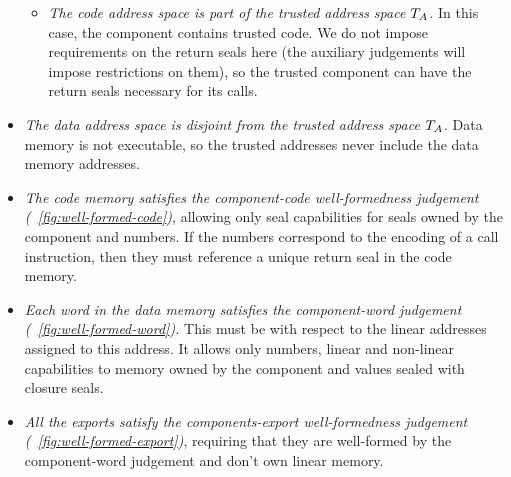 \documentclass[acmsmall,screen]{acmart}\settopmatter{}
\newenvironment{jversion}%
    {\color{OliveGreen}}{}
\begin{document}
\begin{jversion}
\begin{itemize}
\begin{itemize}
  \item \textit{The code address space is part of the trusted address space $T_{A}$.} In this case, the component contains trusted code. We do not impose requirements on the return seals here (the auxiliary judgements will impose restrictions on them), so the trusted component can have the return seals necessary for its calls.
  \end{itemize}
\item \emph{The data address space is disjoint from the trusted address space $T_{A}$.} Data memory is not executable, so the trusted addresses never include the data memory addresses.
\item \textit{The code memory satisfies the component-code well-formedness judgement (\figurename~\ref{fig:well-formed-code})}, allowing only seal capabilities for seals owned by the component and numbers. If the numbers correspond to the encoding of a call instruction, then they must reference a unique return seal in the code memory.
\item \textit{Each word in the data memory satisfies the component-word judgement (\figurename~\ref{fig:well-formed-word}).} This must be with respect to the linear addresses assigned to this address. It allows only numbers, linear and non-linear capabilities to memory owned by the component and values sealed with closure seals.
\item \textit{All the exports satisfy the components-export well-formedness judgement (\figurename~\ref{fig:well-formed-export})}, requiring that they are well-formed by the component-word judgement and don't own linear memory.
\end{itemize}


\end{jversion}
\end{document}
